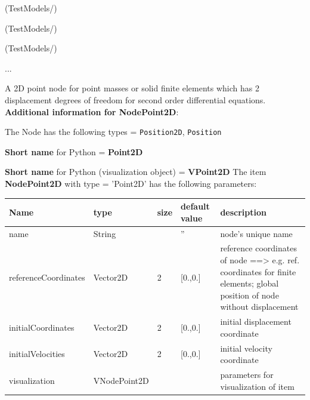 \item {} (TestModels/)
\item {} (TestModels/)
\item {} (TestModels/)
\item  ...

\ei

%
\newpage

\label{sec:item:NodePoint2D}
A 2D point node for point masses or solid finite elements which has 2 displacement degrees of freedom for second order differential equations.\vspace{12pt}
 \\{\bf Additional information for NodePoint2D}:
\bi
  \item The Node has the following types = \texttt{Position2D}, \texttt{Position}
  \item {\bf Short name} for Python = {\bf Point2D}  \item {\bf Short name} for Python (visualization object) = {\bf VPoint2D}\ei
\vspace{12pt} \noindent The item {\bf NodePoint2D} with type = 'Point2D' has the following parameters:\vspace{-1cm}\\ 
\begin{center}
  \footnotesize
  \begin{longtable}{| p{4.5cm} | p{2.5cm} | p{0.5cm} | p{2.5cm} | p{6cm} |}
    \hline
    \bf Name & \bf type & \bf size & \bf default value & \bf description \\ \hline
    name &     String &      &     '' &     node's unique name\\ \hline
    referenceCoordinates &     Vector2D &     2 &     [0.,0.] &     reference coordinates of node ==> e.g. ref. coordinates for finite elements; global position of node without displacement\\ \hline
    initialCoordinates &     Vector2D &     2 &     [0.,0.] &     initial displacement coordinate\\ \hline
    initialVelocities &     Vector2D &     2 &     [0.,0.] &     initial velocity coordinate\\ \hline
    visualization & VNodePoint2D & & & parameters for visualization of item \\ \hline
	  \end{longtable}
	\end{center}
